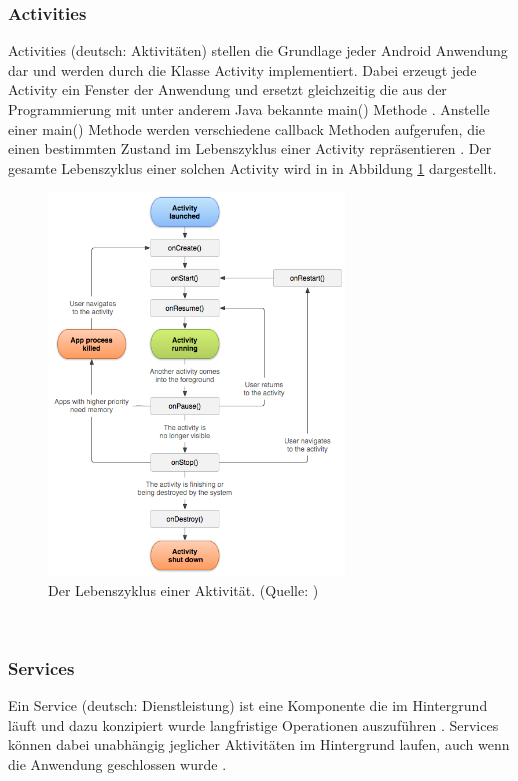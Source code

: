 \subsubsection{Activities}
Activities (deutsch: \glqq Aktivitäten\grqq ) stellen die Grundlage jeder Android Anwendung dar und werden durch die Klasse Activity implementiert. Dabei erzeugt jede Activity ein Fenster der Anwendung und ersetzt gleichzeitig die aus der Programmierung mit unter anderem Java bekannte main() Methode \citep{android:activities}. Anstelle einer main() Methode werden verschiedene callback Methoden aufgerufen, die einen bestimmten Zustand im Lebenszyklus einer Activity repräsentieren \citep{android:activities}. Der gesamte Lebenszyklus einer solchen Activity wird in in Abbildung \ref{fig:activity-lifecycle} dargestellt. 
\begin{figure}[h!]
\centering
\includegraphics[width=0.7\textwidth]{Abbildungen/activity-lifecycle.png}
\caption[Lebenszyklus einer Aktivität]{Der Lebenszyklus einer Aktivität. (Quelle: \citet{android:activity-lifecycle})}
\label{fig:activity-lifecycle}
\end{figure}\\

\subsubsection{Services}
Ein Service (deutsch: \glqq Dienstleistung\grqq ) ist eine Komponente die im Hintergrund läuft und dazu konzipiert wurde langfristige Operationen auszuführen \citep{android:fundamentals}. Services können dabei unabhängig jeglicher Aktivitäten im Hintergrund laufen, auch wenn die Anwendung geschlossen wurde \citep{murphy:beginning-android}.

